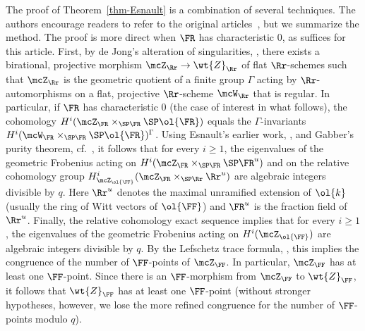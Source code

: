 The proof of Theorem~\ref{thm-Esnault} is a combination of several techniques. The authors encourage readers to refer to the original articles~\cite{Esnaultpadic, EsnaultXu}, but we summarize the method. The proof is more direct when $\FR$ has characteristic $0$, as suffices for this article. First, by de Jong's alteration of singularities, \cite{dJalter}, there exists a birational, projective morphism $\mcZ_\Rr\to \wt{Z}_\Rr$ of flat $\Rr$-schemes such that $\mcZ_\Rr$ is the geometric quotient of a finite group $\Gamma$ acting by $\Rr$-automorphisms on a flat, projective $\Rr$-scheme $\mcW_\Rr$ that is regular. In particular, if $\FR$ has characteristic $0$ (the case of interest in what follows), the cohomology $H^i(\mcZ_\FR \times_{\SP \FR} \SP \ol{\FR})$ equals the $\Gamma$-invariants $H^i(\mcW_\FR \times_{\SP \FR} \SP
\ol{\FR})^\Gamma$. Using Esnault's earlier work, \cite{Esnault_integrality}, and Gabber's purity theorem, cf.~\cite{Fujiwara}, it follows that for every $i\geq 1$, the eigenvalues of the geometric Frobenius acting on $H^i(\mcZ_\FR \times_{\SP \FR} \SP \FR^u)$ and on the relative cohomology group $H^i_{\mcZ_{\ol{\FF}}}(\mcZ_\FR
\times_{\SP \Rr} \Rr^u)$ are algebraic integers divisible by $q$. Here $\Rr^u$ denotes the maximal unramified extension of $\ol{k}$ (usually the ring of Witt vectors of $\ol{\FF}$) and $\FR^u$ is the fraction field of $\Rr^u$. Finally, the relative cohomology exact sequence implies that for every $i\geq 1$, the eigenvalues of the geometric Frobenius acting on $H^i(\mcZ_{\ol{\FF}})$ are algebraic integers divisible by $q$. By the Lefschetz trace formula, \cite[Corollary~III.4.8, p.~109]{SGA5}, this implies the congruence of the number of $\FF$-points of $\mcZ_{\FF}$. In particular, $\mcZ_{\FF}$ has at least one $\FF$-point. Since there is an $\FF$-morphism from $\mcZ_{\FF}$ to $\wt{Z}_{\FF}$, it follows that $\wt{Z}_{\FF}$ has at least one $\FF$-point (without stronger hypotheses, however, we lose the more refined congruence for the number of $\FF$-points modulo $q$).

